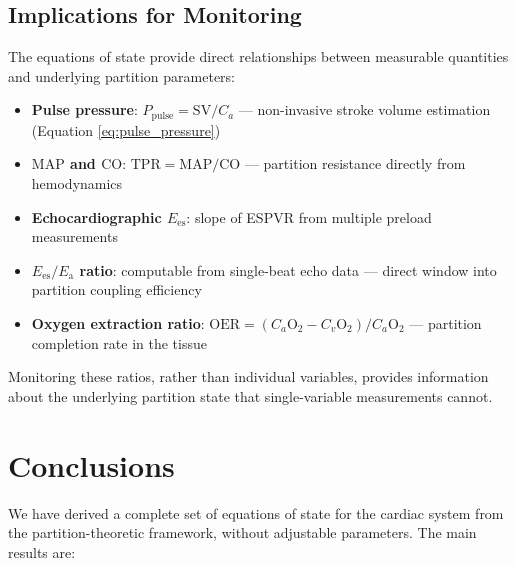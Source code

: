 \documentclass[12pt,a4paper]{article}
\theoremstyle{remark}
\newcommand{\Ees}{E_{\mathrm{es}}}
\newcommand{\Ea}{E_{\mathrm{a}}}
\newcommand{\CO}{\mathrm{CO}}
\newcommand{\SV}{\mathrm{SV}}
\newcommand{\MAP}{\mathrm{MAP}}
\newcommand{\TPR}{\mathrm{TPR}}
\begin{document}
\subsection{Implications for Monitoring}

The equations of state provide direct relationships between measurable quantities and underlying partition parameters:

\begin{itemize}
    \item \textbf{Pulse pressure}: $P_{\mathrm{pulse}} = \SV / C_a$ — non-invasive stroke volume estimation (Equation \ref{eq:pulse_pressure})
    \item \textbf{$\MAP$ and $\CO$}: $\TPR = \MAP/\CO$ — partition resistance directly from hemodynamics
    \item \textbf{Echocardiographic $\Ees$}: slope of ESPVR from multiple preload measurements
    \item \textbf{$\Ees/\Ea$ ratio}: computable from single-beat echo data \cite{chen2001noninvasive} — direct window into partition coupling efficiency
    \item \textbf{Oxygen extraction ratio}: $\mathrm{OER} = (C_a\mathrm{O}_2 - C_v\mathrm{O}_2)/C_a\mathrm{O}_2$ — partition completion rate in the tissue
\end{itemize}

Monitoring these ratios, rather than individual variables, provides information about the underlying partition state that single-variable measurements cannot.

\section{Conclusions}
\label{sec:conclusions}

We have derived a complete set of equations of state for the cardiac system from the partition-theoretic framework, without adjustable parameters. The main results are:
\end{document}
